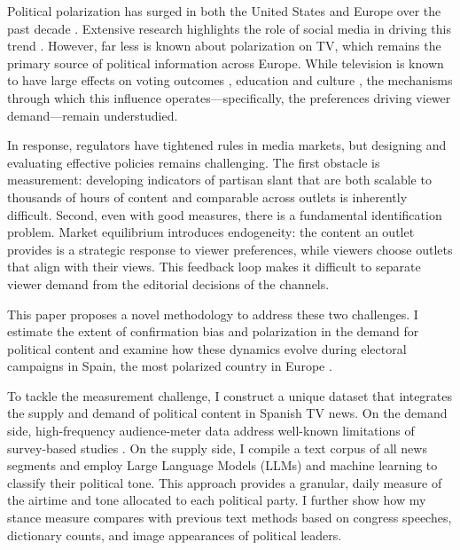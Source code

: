 \documentclass[12pt]{article}
\begin{document}
	
	
	

Political polarization has surged in both the United States and Europe over the past decade \citep{Boxell2020CrossCountryTI, Reiljan2019FearAL}. Extensive research highlights the role of social media in driving this trend \citep{Zhuravskaya2020}. However, far less is known about polarization on TV, which remains the primary source of political information across Europe. While television is known to have large effects on voting outcomes \citep{dellavigna2007fox, gentzkow_turnout, martin2017}, education \citep{gentzkow2008preschool} and culture \citep{jensen2009power}, the mechanisms through which this influence operates—specifically, the preferences driving viewer demand—remain understudied.

In response, regulators have tightened rules in media markets, but designing and evaluating effective policies remains challenging. The first obstacle is measurement: developing indicators of partisan slant that are both scalable to thousands of hours of content and comparable across outlets is inherently difficult. Second, even with good measures, there is a fundamental identification problem. Market equilibrium introduces endogeneity: the content an outlet provides is a strategic response to viewer preferences, while viewers choose outlets that align with their views. This feedback loop makes it difficult to separate viewer demand from the editorial decisions of the channels.

This paper proposes a novel methodology to address these two challenges. I estimate the extent of confirmation bias and polarization in the demand for political content and examine how these dynamics evolve during electoral campaigns in Spain, the most polarized country in Europe \citep{edelman_trust_2023}.

To tackle the measurement challenge, I construct a unique dataset that integrates the supply and demand of political content in Spanish TV news. On the demand side, high-frequency audience-meter data address well-known limitations of survey-based studies \citep{prior}. On the supply side, I compile a text corpus of all news segments and employ Large Language Models (LLMs) and machine learning to classify their political tone. This approach provides a granular, daily measure of the airtime and tone allocated to each political party. I further show how my stance measure compares with previous text methods based on congress speeches, dictionary counts, and image appearances of political leaders.
\end{document}
